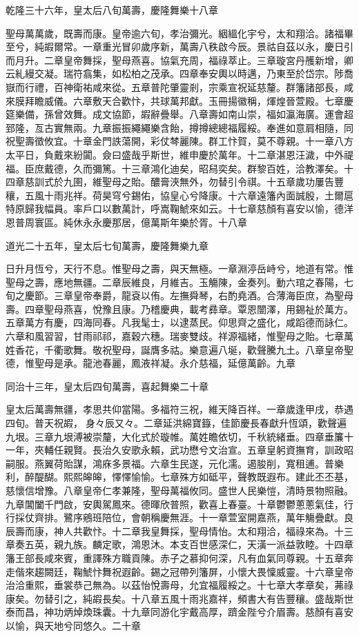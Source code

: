 \begin{pinyinscope}
乾隆三十六年，皇太后八旬萬壽，慶隆舞樂十八章

聖母萬萬歲，既壽而康。皇帝逾六旬，孝治彌光。絪縕化宇兮，太和翔洽。諸福畢至兮，純嘏爾常。一章重光冒卯歲序新，萬壽八秩啟今辰。景祜自茲以永，慶日引而月升。二章皇帝舞採，聖母燕喜。協氣充周，福祿萃止。三章璇宮丹雘新增，卿云糺縵交凝。瑞符翕集，如松柏之茂承。四章奉安輿以時邁，乃東至於岱宗。陟喬嶽而行禮，百神衛祐咸來從。五章普陀肇靈剎，宗乘宣祝延慈釐。群籓諸部長，咸來膜拜瞻威儀。六章敷天合歡忭，共球萬邦獻。玉冊揚徽稱，煇煌晉萱殿。七章慶筵樂備，孫曾效舞。成文協節，嘏辭疊舉。八章壽如南山崇，福如瀛海廣。運會超郅隆，亙古實無兩。九章振振繩繩樂含飴，撙撙總總福履綏。奉進如意肩相隨，同祝聖壽徵攸宜。十章金門詄蕩開，彩仗棽麗陳。群工忭賀，莫不尊親。十一章八方太平日，負戴來紛闐。僉曰盛哉乎斯世，維申慶於萬年。十二章湛恩汪濊，中外禔福。臣庶戴德，久而彌篤。十三章鴻化迪矣，昭舄奕矣。群黎百姓，洽教澤矣。十四章慈訓式於九圉，維聖母之貽。醲膏浹無外，勿替引令祺。十五章歲功屢告豐穰，五風十雨兆祥。荷昊穹兮錫佑，協皇心兮降康。十六章遠籓內面誠殷，土爾扈特原歸我幅員。率戶口以數萬計，呼嵩鞠鯱來如云。十七章慈顏有喜安以愉，德洋恩普周寰區。純休永永慶那居，億萬斯年樂於胥。十八章

道光二十五年，皇太后七旬萬壽，慶隆舞樂九章

日升月恆兮，天行不息。惟聖母之壽，與天無極。一章淵渟岳峙兮，地道有常。惟聖母之壽，應地無疆。二章辰維良，月維吉。玉觴陳，金奏列。動六琯之春陽，七旬之慶節。三章皇帝奉爵，龍袞以侑。左撫舜琴，右酌堯酒。合薄海臣庶，為聖母壽。四章聖母燕喜，悅豫且康。乃稽慶典，載考彞章。覃恩闓澤，用錫祉於萬方。五章萬方有慶，四海同春。凡我髦士，以逮蒸民。仰思齊之盛化，咸蹈德而詠仁。六章和風習習，甘雨祁祁，嘉穀六穗。瑞麥雙歧。祥源福緒，惟聖母之貽。七章萬姓香花，千衢歌舞。敬祝聖母，誕膺多祜。樂意遍八埏，歡聲騰九土。八章皇帝聖德，惟聖母是承。龍池春麗，鳳液祥凝。永介慈福，延億萬齡。九章

同治十三年，皇太后四旬萬壽，喜起舞樂二十章

皇太后萬壽無疆，孝思共仰當陽。多福符三祝，維天降百祥。一章歲逢甲戌，恭遇四旬。普天祝嘏，身々辰又々。二章延洪綿寶籙，佳節慶長春獻升恆頌，歡聲遍九垠。三章九垠溥被崇釐，大化式於璇帷。萬姓瞻依切，千秋統緒垂。四章垂簾十一年，夾輔任親賢。長治久安歌永賴，武功懋兮文治宣。五章皇躬資撫育，訓政昭嗣服。燕翼荷貽謀，鴻庥多景福。六章生民遂，元化濡。遏朘削，寬租逋。普樂利，醉醍醐。熙熙皞皞，懌懌愉愉。七章殊方如砥平，聲教既遐布。建此丕丕基，慈懷信增豫。八章皇帝仁孝兼隆，聖母萬福攸同。盛世人民樂愷，清時景物照融。九章閶闔千門啟，安輿駕鳳來。德暉欣普照，歡喜上春臺。十章鬱鬱蔥蔥氣佳，行行採仗齊排。鷺序鵷班陪位，會朝稱慶無涯。十一章萱室開嘉燕，萬年觴疊獻。良辰壽而康，神人共歡忭。十二章我皇舞採，聖母情怡。太和翔洽，福祿來為。十三章奏五英，親九族。麟定歌，鴻恩沐。本支百世感深仁，天潢一派益敦睦。十四章籓王部長咸來賓，重譯殊方職貢陳。赤子之慕抑何深，凡有血氣同尊親。十五章奔走偕來趨闕廷，鞠鯱忭舞祝遐齡。錫之冠帶列籓屏，小懷大畏懍威靈。十六章皇帝治洽重熙，垂裳恭己無為。以茲怡悅壽母，允宜福履綏之。十七章大孝章矣，茀祿康矣。勿替引之，純嘏長矣。十八章五風十雨兆嘉祥，頻書大有告豐穰。盛哉斯世泰而昌，神功炳焯煥珠囊。十九章同游化宇戴高厚，躋金陛兮介眉壽。慈顏有喜安以愉，與天地兮同悠久。二十章


\end{pinyinscope}
